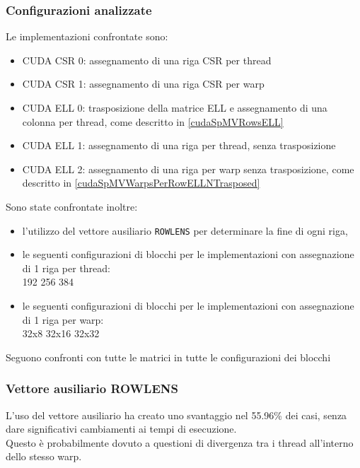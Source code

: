 \documentclass[acmsmall,nonacm=true]{acmart}
\newcommand{\vvv}[1]{{\small\texttt{#1}}}
\begin{document}
\subsubsection{Configurazioni analizzate}
Le implementazioni confrontate sono:
\begin{itemize} 
 \item CUDA CSR 0:	assegnamento di una riga CSR per thread
 \item CUDA CSR 1:	assegnamento di una riga CSR per warp

 \item CUDA ELL 0:
	trasposizione della matrice ELL e assegnamento di una colonna per thread,
	come descritto in \ref{cudaSpMVRowsELL}
 \item CUDA ELL 1:
	assegnamento di una riga per thread, senza trasposizione
 \item CUDA ELL 2:
	assegnamento di una riga per warp senza trasposizione,
	come descritto in \ref{cudaSpMVWarpsPerRowELLNTrasposed}
\end{itemize}

Sono state confrontate inoltre:\\
\begin{itemize}
 \item l'utilizzo del vettore ausiliario \vvv{ROWLENS} per determinare la fine di ogni riga,\\
 \item 
	le seguenti configurazioni di blocchi per le implementazioni con assegnazione di 1 riga per thread:\\
	192 256 384
 \item 
	le seguenti configurazioni di blocchi per le implementazioni con assegnazione di 1 riga per warp:\\
	32x8 32x16 32x32
\end{itemize}

Seguono confronti con tutte le matrici in tutte le configurazioni dei blocchi
\subsubsection{Vettore ausiliario ROWLENS}
L'uso del vettore ausiliario ha creato uno svantaggio nel 55.96\% dei casi, 
senza dare significativi cambiamenti ai tempi di esecuzione.\\
Questo è probabilmente dovuto a questioni di divergenza tra i thread all'interno dello stesso warp.\\
\end{document}
